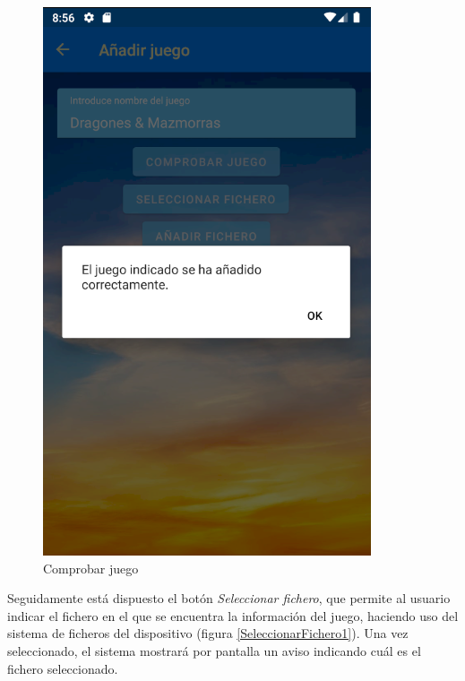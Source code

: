 \begin{figure}[H]
    \centering
    \includegraphics[scale=0.3]{Figures/Capturas/ComprobarJuego.png}
    \caption{Comprobar juego}
    \label{ComprobarJuego}    
\end{figure}

Seguidamente está dispuesto el botón \textit{Seleccionar fichero}, que permite al usuario indicar el fichero en el que se 
encuentra la información del juego, haciendo uso del sistema de ficheros del dispositivo (figura \ref*{SeleccionarFichero1}). 
Una vez seleccionado, el sistema mostrará por pantalla un aviso indicando cuál es el fichero seleccionado.

